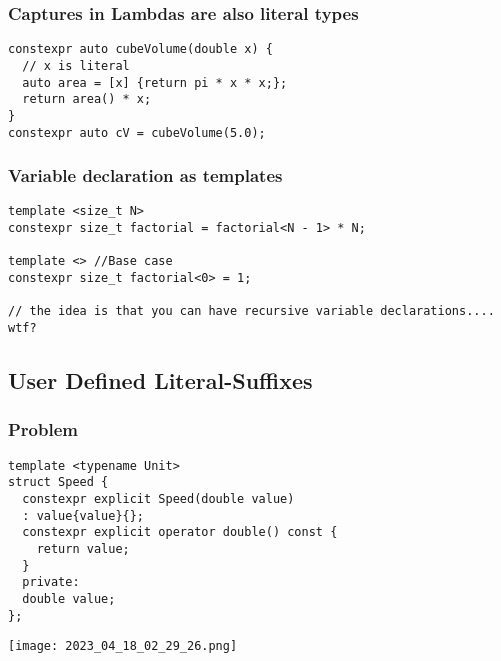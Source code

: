 \documentclass[main.tex,fontsize=8pt,paper=a4,paper=portrait,DIV=calc,]{scrartcl}
\begin{document}
\subsubsection{Captures in Lambdas are also literal types}
\begin{lstlisting}
constexpr auto cubeVolume(double x) {
  // x is literal
  auto area = [x] {return pi * x * x;};
  return area() * x;
}
constexpr auto cV = cubeVolume(5.0);
\end{lstlisting}

\subsubsection{Variable declaration as templates}
\begin{lstlisting}
template <size_t N>
constexpr size_t factorial = factorial<N - 1> * N;

template <> //Base case
constexpr size_t factorial<0> = 1;

// the idea is that you can have recursive variable declarations.... wtf?
\end{lstlisting}

\subsection{User Defined Literal-Suffixes}
\subsubsection{Problem}
\begin{lstlisting}
template <typename Unit>
struct Speed {
  constexpr explicit Speed(double value)
  : value{value}{};
  constexpr explicit operator double() const {
    return value;
  }
  private:
  double value;
};
\end{lstlisting}
\texttt{[image: 2023\_04\_18\_02\_29\_26.png]}
\end{document}
